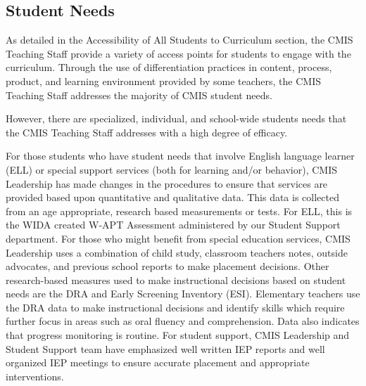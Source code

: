 \subsection{Student Needs}



\begin{findings}
As detailed in the Accessibility of All Students to Curriculum section, the CMIS Teaching Staff provide a variety of access points for students to engage with the curriculum. Through the use of differentiation practices in content, process, product, and learning environment provided by some teachers, the CMIS Teaching Staff addresses the majority of CMIS student needs. 


However, there are specialized, individual, and school-wide students needs that the CMIS Teaching Staff addresses with a high degree of efficacy. 


For those students who have student needs that involve English language learner (ELL) or special support services (both for learning and/or behavior), CMIS Leadership has made changes in the procedures to ensure that services are provided based upon quantitative and qualitative data. This data is collected from an age appropriate, research based measurements or  tests.  For ELL, this is the WIDA created W-APT Assessment administered by our Student Support department. For those who might benefit from special education services, CMIS Leadership uses a combination of child study, classroom teachers notes, outside advocates, and previous school reports to make placement decisions. Other research-based measures used to make instructional decisions based on student needs are the DRA and  Early Screening Inventory (ESI). Elementary teachers use the DRA data to make instructional decisions and identify skills which require further focus in areas such as oral fluency and comprehension. Data also indicates that progress monitoring is routine. For student support, CMIS Leadership and Student Support team have emphasized well written IEP reports and well organized IEP meetings to ensure accurate placement and appropriate interventions. 


\end{findings}
